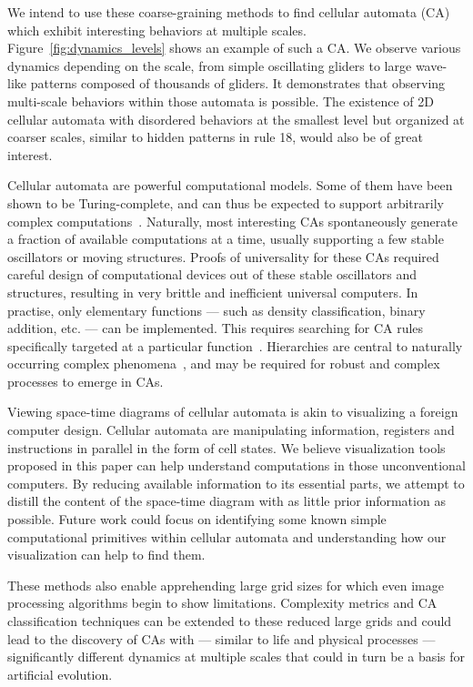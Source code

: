 We intend to use these coarse-graining methods to find cellular automata (CA) which
exhibit interesting behaviors at multiple scales.
Figure~\ref{fig:dynamics_levels} shows an example of such a CA\@. We observe
various dynamics depending on the scale, from simple oscillating gliders to
large wave-like patterns composed of thousands of gliders. It demonstrates that
observing multi-scale behaviors within those automata is possible. The existence
of 2D cellular automata with disordered behaviors at the smallest level but
organized at coarser scales, similar to hidden patterns in rule 18, would also
be of great interest.

Cellular automata are powerful computational models. Some of them have been
shown to be Turing-complete, and can thus be expected to support arbitrarily
complex computations~\parencite{berlekampWinningWaysYour2001,
  cookUniversalityElementaryCellular2004}. Naturally, most interesting CAs
spontaneously generate a fraction of available computations at a time, usually
supporting a few stable oscillators or moving structures. Proofs of universality
for these CAs required careful design of computational devices out of these
stable oscillators and structures, resulting in very brittle and inefficient
universal computers. In practise, only elementary functions --- such as density
classification, binary addition, etc. --- can be implemented. This requires
searching for CA rules specifically targeted at a particular
function~\parencite{mitchellEvolvingCellularAutomata1996, wolframNewKindScience2002,
  sapinResearchCellularAutomaton2003}. Hierarchies are central to naturally
occurring complex phenomena~\parencite{simonArchitectureComplexity1962}, and may be
required for robust and complex processes to emerge in CAs.

Viewing space-time diagrams of cellular automata is akin to visualizing a
foreign computer design. Cellular automata are manipulating information,
registers and instructions in parallel in the form of cell states. We believe
visualization tools proposed in this paper can help understand computations in
those unconventional computers. By reducing available information to its
essential parts, we attempt to distill the content of the space-time diagram
with as little prior information as possible. Future work could focus on
identifying some known simple computational primitives within cellular automata
and understanding how our visualization can help to find them.

These methods also enable apprehending large grid sizes for which even image
processing algorithms begin to show limitations. Complexity metrics and CA
classification techniques can be extended to these reduced large grids and could
lead to the discovery of CAs with --- similar to life and physical processes ---
significantly different dynamics at multiple scales that could in turn be a
basis for artificial evolution.
